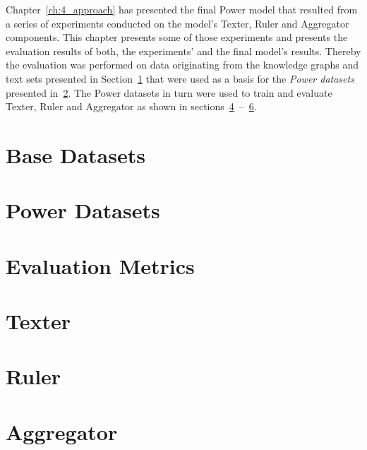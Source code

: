 Chapter~\ref{ch:4_approach} has presented the final Power model that resulted from a series of experiments conducted on the model's Texter, Ruler and Aggregator components. This chapter presents some of those experiments and presents the evaluation results of both, the experiments' and the final model's results. Thereby the evaluation was performed on data originating from the knowledge graphs and text sets presented in Section~\ref{sec:5_experiments/1_base_datasets} that were used as a basis for the \emph{Power datasets} presented in~\ref{sec:5_experiments/2_power_datasets}. The Power datasets in turn were used to train and evaluate Texter, Ruler and Aggregator as shown in sections~\ref{sec:5_experiments/4_texter}~--~\ref{sec:5_experiments/6_aggregator}.


\section{Base Datasets}
\label{sec:5_experiments/1_base_datasets}



\section{Power Datasets}
\label{sec:5_experiments/2_power_datasets}



\section{Evaluation Metrics}
\label{sec:5_experiments/3_metrics}



\section{Texter}
\label{sec:5_experiments/4_texter}



\section{Ruler}
\label{sec:5_experiments/5_ruler}



\section{Aggregator}
\label{sec:5_experiments/6_aggregator}

